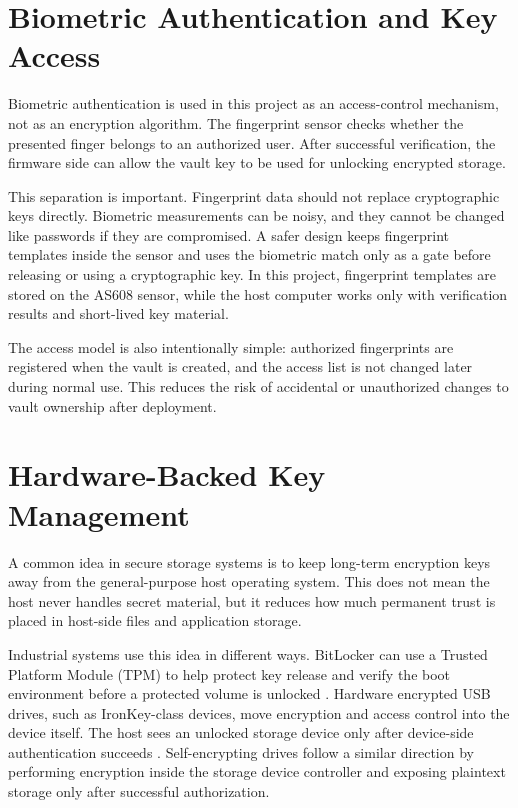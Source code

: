 \section{Biometric Authentication and Key Access}

Biometric authentication is used in this project as an access-control mechanism, not as an encryption algorithm. The fingerprint sensor checks whether the presented finger belongs to an authorized user. After successful verification, the firmware side can allow the vault key to be used for unlocking encrypted storage.

This separation is important. Fingerprint data should not replace cryptographic keys directly. Biometric measurements can be noisy, and they cannot be changed like passwords if they are compromised. A safer design keeps fingerprint templates inside the sensor and uses the biometric match only as a gate before releasing or using a cryptographic key. In this project, fingerprint templates are stored on the AS608 sensor, while the host computer works only with verification results and short-lived key material.

The access model is also intentionally simple: authorized fingerprints are registered when the vault is created, and the access list is not changed later during normal use. This reduces the risk of accidental or unauthorized changes to vault ownership after deployment.

\section{Hardware-Backed Key Management}

A common idea in secure storage systems is to keep long-term encryption keys away from the general-purpose host operating system. This does not mean the host never handles secret material, but it reduces how much permanent trust is placed in host-side files and application storage.

Industrial systems use this idea in different ways. BitLocker can use a Trusted Platform Module (TPM) to help protect key release and verify the boot environment before a protected volume is unlocked \cite{microsoftBitlocker}. Hardware encrypted USB drives, such as IronKey-class devices, move encryption and access control into the device itself. The host sees an unlocked storage device only after device-side authentication succeeds \cite{skorobogatovIronKey}. Self-encrypting drives follow a similar direction by performing encryption inside the storage device controller and exposing plaintext storage only after successful authorization.

